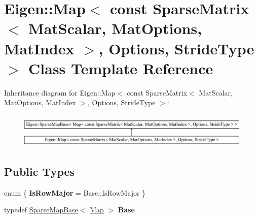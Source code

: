 \hypertarget{class_eigen_1_1_map_3_01const_01_sparse_matrix_3_01_mat_scalar_00_01_mat_options_00_01_mat_index4032bba20cf92aab8bcf07e926e15a4f}{}\section{Eigen\+::Map$<$ const Sparse\+Matrix$<$ Mat\+Scalar, Mat\+Options, Mat\+Index $>$, Options, Stride\+Type $>$ Class Template Reference}
\label{class_eigen_1_1_map_3_01const_01_sparse_matrix_3_01_mat_scalar_00_01_mat_options_00_01_mat_index4032bba20cf92aab8bcf07e926e15a4f}
Inheritance diagram for Eigen\+::Map$<$ const Sparse\+Matrix$<$ Mat\+Scalar, Mat\+Options, Mat\+Index $>$, Options, Stride\+Type $>$\+:\begin{figure}[H]
\begin{center}
\leavevmode
\includegraphics[height=1.669151cm]{class_eigen_1_1_map_3_01const_01_sparse_matrix_3_01_mat_scalar_00_01_mat_options_00_01_mat_index4032bba20cf92aab8bcf07e926e15a4f}
\end{center}
\end{figure}
\subsection*{Public Types}
\begin{DoxyCompactItemize}
\item 
\mbox{\label{class_eigen_1_1_map_3_01const_01_sparse_matrix_3_01_mat_scalar_00_01_mat_options_00_01_mat_index4032bba20cf92aab8bcf07e926e15a4f_a4b36b02955df122a33e14fa44772aec6}} 
enum \{ {\bfseries Is\+Row\+Major} = Base\+::Is\+Row\+Major
 \}
\item 
\mbox{\label{class_eigen_1_1_map_3_01const_01_sparse_matrix_3_01_mat_scalar_00_01_mat_options_00_01_mat_index4032bba20cf92aab8bcf07e926e15a4f_a4f77a5f03f27d99e8b23ab2cf2141c7a}} 
typedef \mbox{\hyperlink{class_eigen_1_1_sparse_map_base}{Sparse\+Map\+Base}}$<$ \mbox{\hyperlink{class_eigen_1_1_map}{Map}} $>$ {\bfseries Base}
\end{DoxyCompactItemize}
